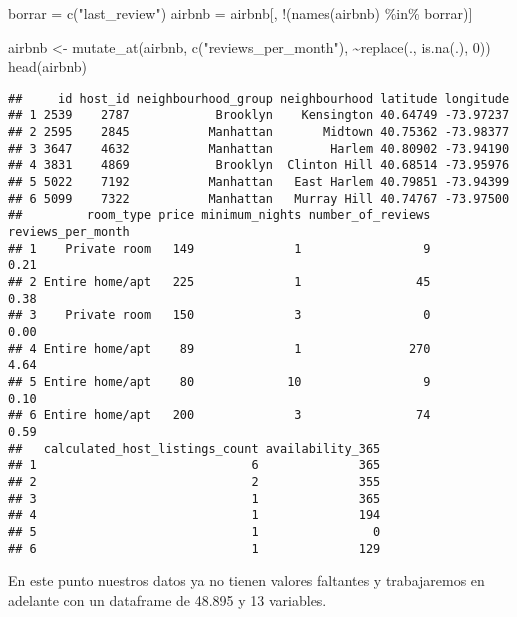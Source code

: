 \documentclass[
]{book}
\newenvironment{Shaded}{\begin{snugshade}}{\end{snugshade}}
\newcommand{\DecValTok}[1]{\textcolor[rgb]{0.00,0.00,0.81}{#1}}
\newcommand{\FunctionTok}[1]{\textcolor[rgb]{0.00,0.00,0.00}{#1}}
\newcommand{\NormalTok}[1]{#1}
\newcommand{\OtherTok}[1]{\textcolor[rgb]{0.56,0.35,0.01}{#1}}
\newcommand{\SpecialCharTok}[1]{\textcolor[rgb]{0.00,0.00,0.00}{#1}}
\newcommand{\StringTok}[1]{\textcolor[rgb]{0.31,0.60,0.02}{#1}}
\begin{document}
\begin{Shaded}
\begin{Highlighting}[]
\NormalTok{borrar }\OtherTok{=} \FunctionTok{c}\NormalTok{(}\StringTok{"last\_review"}\NormalTok{)}
\NormalTok{airbnb }\OtherTok{=}\NormalTok{ airbnb[, }\SpecialCharTok{!}\NormalTok{(}\FunctionTok{names}\NormalTok{(airbnb) }\SpecialCharTok{\%in\%}\NormalTok{ borrar)]}

\NormalTok{airbnb }\OtherTok{\textless{}{-}} \FunctionTok{mutate\_at}\NormalTok{(airbnb, }\FunctionTok{c}\NormalTok{(}\StringTok{"reviews\_per\_month"}\NormalTok{), }\SpecialCharTok{\textasciitilde{}}\FunctionTok{replace}\NormalTok{(., }\FunctionTok{is.na}\NormalTok{(.), }\DecValTok{0}\NormalTok{))}
\FunctionTok{head}\NormalTok{(airbnb)}
\end{Highlighting}
\end{Shaded}

\begin{verbatim}
##     id host_id neighbourhood_group neighbourhood latitude longitude
## 1 2539    2787            Brooklyn    Kensington 40.64749 -73.97237
## 2 2595    2845           Manhattan       Midtown 40.75362 -73.98377
## 3 3647    4632           Manhattan        Harlem 40.80902 -73.94190
## 4 3831    4869            Brooklyn  Clinton Hill 40.68514 -73.95976
## 5 5022    7192           Manhattan   East Harlem 40.79851 -73.94399
## 6 5099    7322           Manhattan   Murray Hill 40.74767 -73.97500
##         room_type price minimum_nights number_of_reviews reviews_per_month
## 1    Private room   149              1                 9              0.21
## 2 Entire home/apt   225              1                45              0.38
## 3    Private room   150              3                 0              0.00
## 4 Entire home/apt    89              1               270              4.64
## 5 Entire home/apt    80             10                 9              0.10
## 6 Entire home/apt   200              3                74              0.59
##   calculated_host_listings_count availability_365
## 1                              6              365
## 2                              2              355
## 3                              1              365
## 4                              1              194
## 5                              1                0
## 6                              1              129
\end{verbatim}

En este punto nuestros datos ya no tienen valores faltantes y trabajaremos en adelante con un dataframe de 48.895 y 13 variables.
\end{document}
